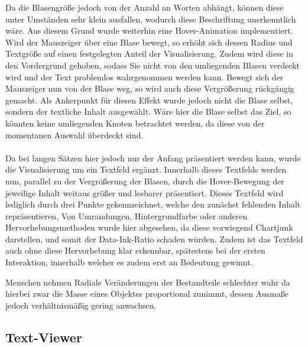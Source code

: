 Da die Blasengr\"o{\ss}e jedoch von der Anzahl an Worten abh\"angt, k\"onnen diese unter Umst\"anden sehr klein ausfallen, wodurch diese Beschriftung unerkenntlich w\"are. Aus diesem Grund wurde weiterhin eine Hover-Animation implementiert. Wird der Mauszeiger \"uber eine Blase bewegt, so erh\"oht sich dessen Radius und Textgr\"o{\ss}e auf einen festgelegten Anteil der Visualisierung. Zudem wird diese in den Vordergrund gehoben, sodass Sie nicht von den umliegenden Blasen verdeckt wird und der Text problemlos wahrgenommen werden kann. Bewegt sich der Mauszeiger nun von der Blase weg, so wird auch diese Vergr\"o{\ss}erung r\"uckg\"angig gemacht. Als Ankerpunkt f\"ur diesen Effekt wurde jedoch nicht die Blase selbst, sondern der textliche Inhalt ausgew\"ahlt. W\"are hier die Blase selbst das Ziel, so k\"onnten keine umliegenden Knoten betrachtet werden, da diese von der momentanen Auswahl \"uberdeckt sind.\\
\\
Da bei langen S\"atzen hier jedoch nur der Anfang pr\"asentiert werden kann, wurde die Visualisierung um ein Textfeld erg\"anzt. Innerhalb dieses Textfelds werden nun, parallel zu der Vergr\"o{\ss}erung der Blasen, durch die Hover-Bewegung der jeweilige Inhalt weitaus gr\"o{\ss}er und lesbarer pr\"asentiert. Dieses Textfeld wird lediglich durch drei Punkte gekennzeichnet, welche den zun\"achst fehlenden Inhalt repr\"asentieren. Von Umrandungen, Hintergrundfarbe oder anderen Hervorhebungsmethoden wurde hier abgesehen, da diese vorwiegend Chartjunk darstellen, und somit der Data-Ink-Ratio schaden w\"urden. Zudem ist das Textfeld auch ohne diese Hervorhebung klar erkennbar, sp\"atestens bei der ersten Interaktion, innerhalb welcher es zudem erst an Bedeutung gewinnt.


Menschen nehmen Radiale Ver\"anderungen der Bestandteile schlechter wahr da hierbei zwar die Masse eines Objektes proportional zunimmt, dessen Ausma{\ss}e jedoch verh\"altnism\"a{\ss}ig gering anwachsen.

\subsection{Text-Viewer}
